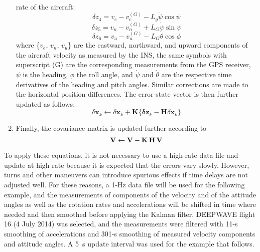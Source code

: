 \documentclass[12pt,twoside,english,12pt,twoside,english]{article}\usepackage[]{graphicx}\usepackage[]{color}
\let\OrgIndex\index
\renewcommand*{\index}[1]{\OrgIndex{#1}}
\begin{document}
\begin{enumerate}
rate of the aircraft:\\
\[
\delta z_{4}=v_{e}-v_{e}^{(G)}-L_{g}\dot{\psi}\cos\psi
\]
\begin{equation}
\delta z_{5}=v_{n}-v_{n}^{(G)}+L_{G}\dot{\psi}\sin\psi\label{eq:GPScorrection}
\end{equation}
\[
\delta z_{6}=v_{u}-v_{u}^{(G)}-L_{G}\dot{\theta}\cos\phi
\]
where \{$v_{e},\,v_{n},\,v_{u}$\} are the eastward, northward, and
upward components of the aircraft velocity
as measured by the INS,
the same symbols with superscript (G) are the corresponding measurements
from the GPS receiver, $\psi$ is the
heading, $\phi$ the roll angle, and $\dot{\psi}$ and $\dot{\theta}$
are the respective time derivatives
of the heading and pitch angles. Similar corrections
are made to the horizontal position differences. The error-state vector
is then further updated as follows:\\
\begin{equation}
\delta\mathbf{x}_{k}\leftarrow\delta\mathbf{x}_{k}+\mathbf{K\{\delta}\mathbf{z}_{k}-\mathbf{H}\delta\mathbf{x}_{k}\}\label{eq:post-update-sv}
\end{equation}
\item Finally, the covariance matrix
is updated further according to\\
\begin{equation}
\mathbf{V}\leftarrow\mathbf{V}-\mathbf{K}\thinspace\mathbf{H}\thinspace\mathbf{V}\label{eq:post-cv-update}
\end{equation}
\end{enumerate}
To apply these equations, it is not necessary to use a high-rate data
file and update at high rate because it is expected
that the errors vary slowly.
However, turns and other maneuvers can introduce spurious effects
if time delays are not adjusted well. For these reasons, a 1-Hz data
file will be used for the following example, and the measurements
of components of the velocity and of the attitude angles
as well as the rotation rates and accelerations
 will be shifted in time where needed and then smoothed before applying
the Kalman filter. DEEPWAVE flight
16 (4 July 2014) was selected, and the measurements were filtered
with 11-s smoothing of accelerations
and 301-s smoothing of measured velocity components and attitude angles.
A 5~s update interval was used for the example that follows.
\end{document}
